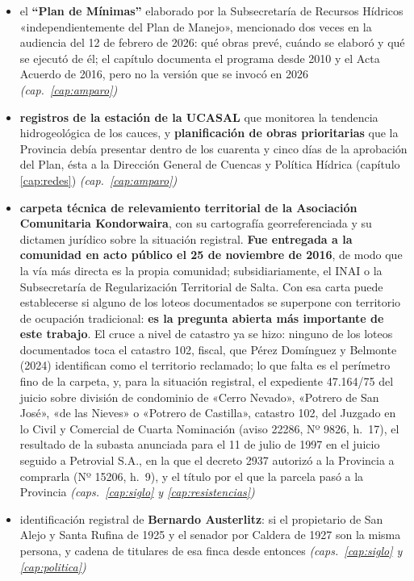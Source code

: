 \begin{itemize}[leftmargin=*]
\item el \textbf{``Plan de Mínimas''} elaborado por la Subsecretaría de Recursos Hídricos «independientemente del Plan de Manejo», mencionado dos veces en la audiencia del 12 de febrero de 2026: qué obras prevé, cuándo se elaboró y qué se ejecutó de él; el capítulo documenta el programa desde 2010 y el Acta Acuerdo de 2016, pero no la versión que se invocó en 2026 \textit{(cap.\ \ref{cap:amparo})}
\item \textbf{registros de la estación de la UCASAL} que monitorea la tendencia hidrogeológica de los cauces, y \textbf{planificación de obras prioritarias} que la Provincia debía presentar dentro de los cuarenta y cinco días de la aprobación del Plan, ésta a la Dirección General de Cuencas y Política Hídrica (capítulo \ref{cap:redes}) \textit{(cap.\ \ref{cap:amparo})}
\item \textbf{carpeta técnica de relevamiento territorial de la Asociación Comunitaria Kondorwaira}, con su cartografía georreferenciada y su dictamen jurídico sobre la situación registral. \textbf{Fue entregada a la comunidad en acto público el 25 de noviembre de 2016}, de modo que la vía más directa es la propia comunidad; subsidiariamente, el INAI o la Subsecretaría de Regularización Territorial de Salta. Con esa carta puede establecerse si alguno de los loteos documentados se superpone con territorio de ocupación tradicional: \textbf{es la pregunta abierta más importante de este trabajo}. El cruce a nivel de catastro ya se hizo: ninguno de los loteos documentados toca el catastro 102, fiscal, que Pérez Domínguez y Belmonte (2024) identifican como el territorio reclamado; lo que falta es el perímetro fino de la carpeta, y, para la situación registral, el expediente 47.164/75 del juicio sobre división de condominio de «Cerro Nevado», «Potrero de San José», «de las Nieves» o «Potrero de Castilla», catastro 102, del Juzgado en lo Civil y Comercial de Cuarta Nominación (aviso 22286, Nº 9826, h.\ 17), el resultado de la subasta anunciada para el 11 de julio de 1997 en el juicio seguido a Petrovial S.A., en la que el decreto 2937 autorizó a la Provincia a comprarla (Nº 15206, h.\ 9), y el título por el que la parcela pasó a la Provincia \textit{(caps.\ \ref{cap:siglo} y \ref{cap:resistencias})}
\item identificación registral de \textbf{Bernardo Austerlitz}: si el propietario de San Alejo y Santa Rufina de 1925 y el senador por Caldera de 1927 son la misma persona, y cadena de titulares de esa finca desde entonces \textit{(caps.\ \ref{cap:siglo} y \ref{cap:politica})}

\end{itemize}
